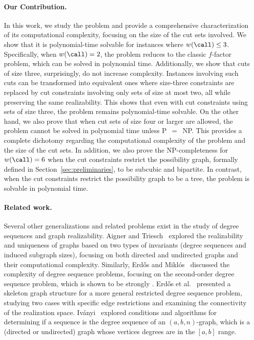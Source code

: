 \paragraph{Our Contribution.} 
%
In this work, we study the \GRC{} problem and provide a comprehensive characterization of its computational complexity, focusing on the size of the cut sets involved. 
%
We show that it is polynomial-time solvable for instances where $w(\call)\le3$. Specifically, when $w(\call)=2$, the problem reduces to the classic $f$-factor problem,  which can be solved in polynomial time. 
%
Additionally, we show that cuts of size three, surprisingly, do not increase complexity. Instances involving such cuts can be transformed into equivalent ones where size-three constraints are replaced by cut constraints involving only sets of size at most two, all while preserving the same realizability. 
This shows that even with cut constraints using sets of size three, the problem remains polynomial-time solvable. 
%
On the other hand, we also prove that when cut sets of size four or larger are allowed, the problem cannot be solved in polynomial time unless P~$=$~NP. 
This provides a complete dichotomy regarding the computational complexity of the problem and the size of the cut sets.
In addition, we also prove the NP-completeness for $w(\call)= 6$ when the cut constraints restrict the possibility graph, formally defined in Section~\ref{sec:preliminaries}, to be subcubic and bipartite. 
%
In contrast, when the cut constraints restrict the possibility graph to be a tree, the problem is solvable in polynomial time. 
%

\paragraph{Related work.}
Several other generalizations and related problems exist in the study of degree sequences and graph realizability. %
Aigner and Triesch~\cite{aigner1994realizability} explored the realizability and uniqueness of graphs based on two types of invariants (degree sequences and induced subgraph sizes), focusing on both directed and undirected graphs and their computational complexity.
% 
Similarly, Erdős and Miklós~\cite{erdos2018} discussed the complexity of degree sequence problems, focusing on the second-order degree sequence problem, which is shown to be strongly \classNPC{}. 
%
Erdős et al.~\cite{erdos17} presented a skeleton graph structure for a more general restricted degree sequence problem, studying two cases with specific edge restrictions and examining the connectivity of the realization space.
%
Iványi~\cite{Iv12} explored conditions and algorithms for determining if a sequence is the degree sequence of an $(a, b, n)$-graph,
which is a (directed or undirected) graph whose vertices degrees are in the $[a, b]$ range.

